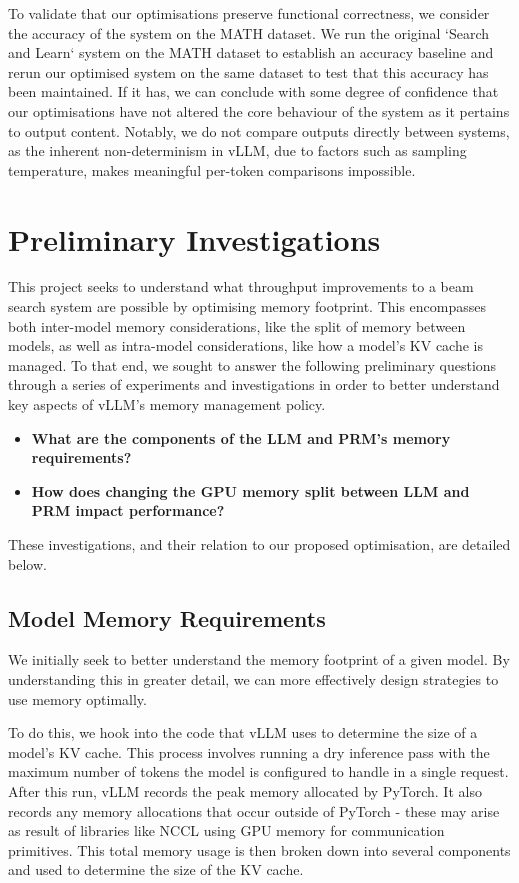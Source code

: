 \documentclass[12pt,twoside]{report}
\begin{document}
To validate that our optimisations preserve functional correctness, we consider the accuracy of the system on the MATH dataset. 
We run the original `Search and Learn` system on the MATH dataset to establish an accuracy baseline and rerun our optimised system on the same dataset to test that this accuracy has been maintained.
If it has, we can conclude with some degree of confidence that our optimisations have not altered the core behaviour of the system as it pertains to output content.
Notably, we do not compare outputs directly between systems, as the inherent non-determinism in vLLM, due to factors such as sampling temperature, makes meaningful per-token comparisons impossible.

\chapter{Preliminary Investigations}
This project seeks to understand what throughput improvements to a beam search system are possible by optimising memory footprint.
This encompasses both inter-model memory considerations, like the split of memory between models, as well as intra-model considerations, like how a model's KV cache is managed.
To that end, we sought to answer the following preliminary questions through a series of experiments and investigations in order to better understand key aspects of vLLM's memory management policy.
\begin{itemize}
    \item \textbf{What are the components of the LLM and PRM's memory requirements?}
    \item \textbf{How does changing the GPU memory split between LLM and PRM impact performance?}
\end{itemize}
These investigations, and their relation to our proposed optimisation, are detailed below.

\section{Model Memory Requirements}
We initially seek to better understand the memory footprint of a given model.
By understanding this in greater detail, we can more effectively design strategies to use memory optimally.

To do this, we hook into the code that vLLM uses to determine the size of a model's KV cache.
This process involves running a dry inference pass with the maximum number of tokens the model is configured to handle in a single request.
After this run, vLLM records the peak memory allocated by PyTorch.
It also records any memory allocations that occur outside of PyTorch - these may arise as result of libraries like NCCL using GPU memory for communication primitives.
This total memory usage is then broken down into several components and used to determine the size of the KV cache.
\end{document}
